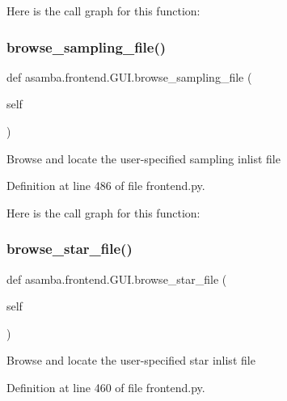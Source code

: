 Here is the call graph for this function\+:
\mbox{\label{classasamba_1_1frontend_1_1_g_u_i_ac0b39055d224594aca6190e6c0d7fe7e}} 
\subsubsection{\texorpdfstring{browse\+\_\+sampling\+\_\+file()}{browse\_sampling\_file()}}
{\footnotesize\ttfamily def asamba.\+frontend.\+G\+U\+I.\+browse\+\_\+sampling\+\_\+file (\begin{DoxyParamCaption}\item[{}]{self }\end{DoxyParamCaption})}

\begin{DoxyVerb}Browse and locate the user-specified sampling inlist file \end{DoxyVerb}
 

Definition at line 486 of file frontend.\+py.

Here is the call graph for this function\+:
\mbox{\label{classasamba_1_1frontend_1_1_g_u_i_a092f06f2cb8a31817b414a34f9dc52cf}} 
\subsubsection{\texorpdfstring{browse\+\_\+star\+\_\+file()}{browse\_star\_file()}}
{\footnotesize\ttfamily def asamba.\+frontend.\+G\+U\+I.\+browse\+\_\+star\+\_\+file (\begin{DoxyParamCaption}\item[{}]{self }\end{DoxyParamCaption})}

\begin{DoxyVerb}Browse and locate the user-specified star inlist file \end{DoxyVerb}
 

Definition at line 460 of file frontend.\+py.

